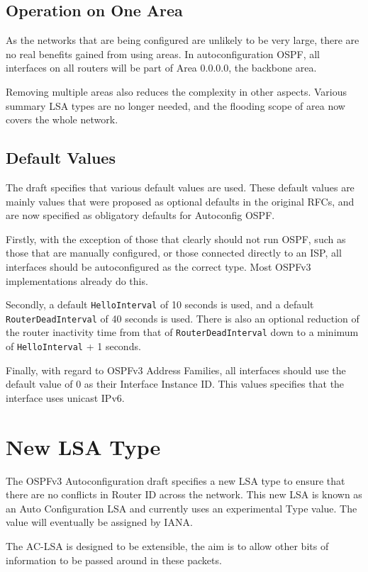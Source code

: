 \documentclass[12pt]{report}
\begin{document}
\subsection{Operation on One Area}
As the networks that are being configured are unlikely to be very large, there
are no real benefits gained from using areas. In autoconfiguration OSPF, all
interfaces on all routers will be part of Area 0.0.0.0, the backbone area.

Removing multiple areas also reduces the complexity in other aspects. Various
summary LSA types are no longer needed, and the flooding scope of area now
covers the whole network.

\subsection{Default Values}
The draft specifies that various default values are used. These default values
are mainly values that were proposed as optional defaults in the original RFCs,
and are now specified as obligatory defaults for Autoconfig OSPF\@. 

Firstly, with the exception of those that clearly should not run OSPF, such as
those that are manually configured, or those connected directly to an ISP, all
interfaces should be autoconfigured as the correct type. Most OSPFv3
implementations already do this. 

Secondly, a default \texttt{HelloInterval} of 10 seconds is used, and a default
\texttt{RouterDeadInterval} of 40 seconds is used. There is also an optional
reduction of the router inactivity time from that of
\texttt{RouterDeadInterval} down to a minimum of \texttt{HelloInterval} + 1
seconds. 

Finally, with regard to OSPFv3 Address Families, all interfaces should use the
default value of 0 as their Interface Instance ID\@. This values specifies that
the interface uses unicast IPv6.  

\section{New LSA Type}
The OSPFv3 Autoconfiguration draft specifies a new LSA type to ensure that
there are no conflicts in Router ID across the network. This new LSA is known
as an Auto Configuration LSA and currently uses an experimental Type value. The
value will eventually be assigned by IANA\@. 

The AC-LSA is designed to be extensible, the aim is to allow other bits of
information to be passed around in these packets. 
\end{document}

